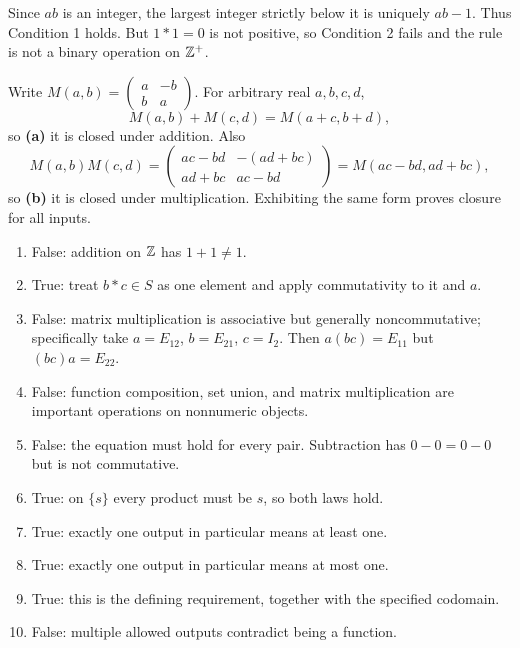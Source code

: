 
Since $ab$ is an integer, the largest integer strictly below it is uniquely $ab-1$. Thus Condition 1 holds. But $1*1=0$ is not positive, so Condition 2 fails and the rule is not a binary operation on $\mathbb{Z}^+$.


Write $M(a,b)=\begin{pmatrix}a&-b\\b&a\end{pmatrix}$. For arbitrary real $a,b,c,d$,
\[M(a,b)+M(c,d)=M(a+c,b+d),\]
so \textbf{(a)} it is closed under addition. Also
\[M(a,b)M(c,d)=\begin{pmatrix}ac-bd&-(ad+bc)\\ad+bc&ac-bd\end{pmatrix}=M(ac-bd,ad+bc),\]
so \textbf{(b)} it is closed under multiplication. Exhibiting the same form proves closure for all inputs.


\begin{enumerate}[label=(\alph*)]
\item False: addition on $\mathbb{Z}$ has $1+1\ne1$.
\item True: treat $b*c\in S$ as one element and apply commutativity to it and $a$.
\item False: matrix multiplication is associative but generally noncommutative; specifically take $a=E_{12}$, $b=E_{21}$, $c=I_2$. Then $a(bc)=E_{11}$ but $(bc)a=E_{22}$.
\item False: function composition, set union, and matrix multiplication are important operations on nonnumeric objects.
\item False: the equation must hold for every pair. Subtraction has $0-0=0-0$ but is not commutative.
\item True: on $\{s\}$ every product must be $s$, so both laws hold.
\item True: exactly one output in particular means at least one.
\item True: exactly one output in particular means at most one.
\item True: this is the defining requirement, together with the specified codomain.
\item False: multiple allowed outputs contradict being a function.
\end{enumerate}


